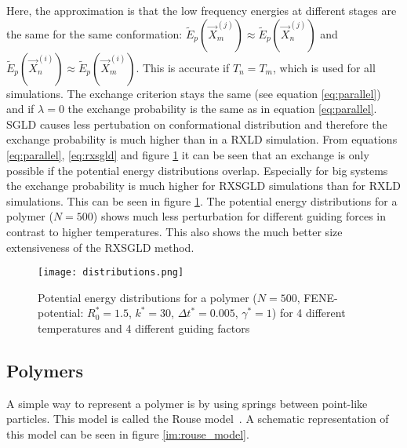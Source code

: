 \documentclass[a4paper]{article}
\begin{document}
Here, the approximation is that the low frequency energies at different stages are the same for the same conformation: $\tilde{E}_p \left( \vec{X}_m^{(j)} \right) \approx \tilde{E}_p \left( \vec{X}_n^{(j)} \right)$ and $\tilde{E}_p \left( \vec{X}_n^{(i)} \right) \approx \tilde{E}_p \left( \vec{X}_m^{(i)} \right)$. This is accurate if $T_n = T_m$, which is used for all simulations. The exchange criterion stays the same (see equation \ref{eq:parallel}) and if $\lambda = 0$ the exchange probability is the same as in equation \ref{eq:parallel}. SGLD causes less pertubation on conformational distribution and therefore the exchange probability is much higher than in a RXLD simulation. From equations \ref{eq:parallel}, \ref{eq:rxsgld} and figure \ref{im:distributions} it can be seen that an exchange is only possible if the potential energy distributions overlap. Especially for big systems the exchange probability is much higher for RXSGLD simulations than for RXLD simulations. This can be seen in figure \ref{im:distributions}. The potential energy distributions for a polymer ($N = 500$) shows much less perturbation for different guiding forces in contrast to higher temperatures. This also shows the much better size extensiveness of the RXSGLD method.

\begin{figure} [H]
\centering
\texttt{[image: distributions.png]}
\caption{Potential energy distributions for a polymer ($N = 500$, FENE-potential: $R_0^* = 1.5$, $k^* = 30$, $\Delta t^* = 0.005$, $\gamma^* = 1$) for 4 different temperatures and 4 different guiding factors}
\label{im:distributions}
\end{figure}

\subsection{Polymers}

A simple way to represent a polymer is by using springs between point-like particles. This model is called the Rouse model~\cite{Rouse1953}. A schematic representation of this model can be seen in figure \ref{im:rouse_model}.
\end{document}
